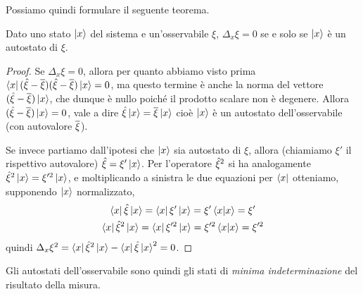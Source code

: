 Possiamo quindi formulare il seguente teorema.
\begin{teorema} \label{t:autostato-indeterminazione-nulla}
	Dato uno stato $\left|{x}\right\rangle$ del sistema e un'osservabile $\xi$, $\Delta_x\xi=0$ se e solo se $\left|{x}\right\rangle$ è un autostato di $\xi$.
\end{teorema}
\begin{proof}
	Se $\Delta_x\xi=0$, allora per quanto abbiamo visto prima $\left\langle{x}\right|(\hat{\xi}-\overline{\xi})(\hat{\xi}-\overline{\xi})\left|{x}\right\rangle=0$, ma questo termine è anche la norma del vettore $(\hat{\xi}-\overline{\xi})\left|{x}\right\rangle$, che dunque è nullo poich\'e il prodotto scalare non è degenere.
	Allora $(\hat{\xi}-\overline{\xi})\left|{x}\right\rangle=0$, vale a dire $\hat{\xi}\left|{x}\right\rangle=\overline{\xi}\left|{x}\right\rangle$ cioè $\left|{x}\right\rangle$ è un autostato dell'osservabile (con autovalore $\overline{\xi}$).

	Se invece partiamo dall'ipotesi che $\left|{x}\right\rangle$ sia autostato di $\xi$, allora (chiamiamo $\xi'$ il rispettivo autovalore) $\hat{\xi}=\xi'\left|{x}\right\rangle$.
	Per l'operatore $\hat{\xi}^2$ si ha analogamente $\hat{\xi}^2\left|{x}\right\rangle=\xi'^2\left|{x}\right\rangle$, e moltiplicando a sinistra le due equazioni per $\left\langle{x}\right|$ otteniamo, supponendo $\left|{x}\right\rangle$ normalizzato,
	\begin{gather}
		\left\langle{x}\right|\hat{\xi}\left|{x}\right\rangle=\left\langle{x}\right|\xi'\left|{x}\right\rangle=\xi'\left\langle{x}\middle|{x}\right\rangle=\xi'\\
		\left\langle{x}\right|\hat{\xi}^2\left|{x}\right\rangle=\left\langle{x}\right|\xi'^2\left|{x}\right\rangle=\xi'^2\left\langle{x}\middle|{x}\right\rangle=\xi'^2
	\end{gather}
	quindi $\Delta_x\xi^2=\left\langle{x}\right|\hat{\xi}^2\left|{x}\right\rangle-\left\langle{x}\right|\hat{\xi}\left|{x}\right\rangle^2=0$.
\end{proof}
Gli autostati dell'osservabile sono quindi gli stati di \emph{minima indeterminazione} del risultato della misura.

